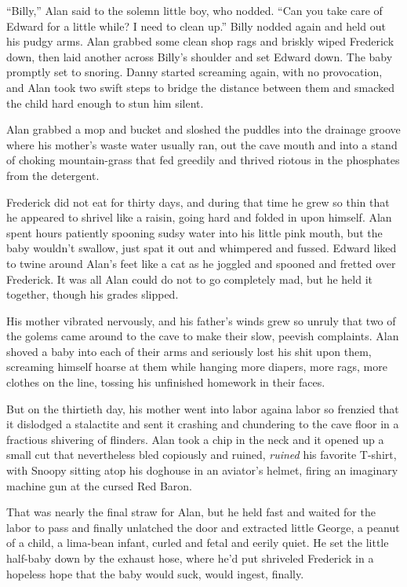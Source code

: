 ``Billy,'' Alan said to the solemn little boy, who nodded.  ``Can you
take care of Edward for a little while?  I need to clean up.'' Billy
nodded again and held out his pudgy arms.  Alan grabbed some clean
shop rags and briskly wiped Frederick down, then laid another across
Billy's shoulder and set Edward down.  The baby promptly set to
snoring.  Danny started screaming again, with no provocation, and Alan
took two swift steps to bridge the distance between them and smacked
the child hard enough to stun him silent.

Alan grabbed a mop and bucket and sloshed the puddles into the
drainage groove where his mother's waste water usually ran, out the
cave mouth and into a stand of choking mountain-grass that fed
greedily and thrived riotous in the phosphates from the detergent.

Frederick did not eat for thirty days, and during that time he grew so
thin that he appeared to shrivel like a raisin, going hard and folded
in upon himself.  Alan spent hours patiently spooning sudsy water into
his little pink mouth, but the baby wouldn't swallow, just spat it out
and whimpered and fussed.  Edward liked to twine around Alan's feet
like a cat as he joggled and spooned and fretted over Frederick.  It
was all Alan could do not to go completely mad, but he held it
together, though his grades slipped.

His mother vibrated nervously, and his father's winds grew so unruly
that two of the golems came around to the cave to make their slow,
peevish complaints.  Alan shoved a baby into each of their arms and
seriously lost his shit upon them, screaming himself hoarse at them
while hanging more diapers, more rags, more clothes on the line,
tossing his unfinished homework in their faces.

But on the thirtieth day, his mother went into labor again\dash{}a labor
so frenzied that it dislodged a stalactite and sent it crashing and
chundering to the cave floor in a fractious shivering of flinders. 
Alan took a chip in the neck and it opened up a small cut that
nevertheless bled copiously and ruined, \textit{ruined} his favorite
T-shirt, with Snoopy sitting atop his doghouse in an aviator's helmet,
firing an imaginary machine gun at the cursed Red Baron.

That was nearly the final straw for Alan, but he held fast and waited
for the labor to pass and finally unlatched the door and extracted
little George, a peanut of a child, a lima-bean infant, curled and
fetal and eerily quiet.  He set the little half-baby down by the
exhaust hose, where he'd put shriveled Frederick in a hopeless hope
that the baby would suck, would ingest, finally.

